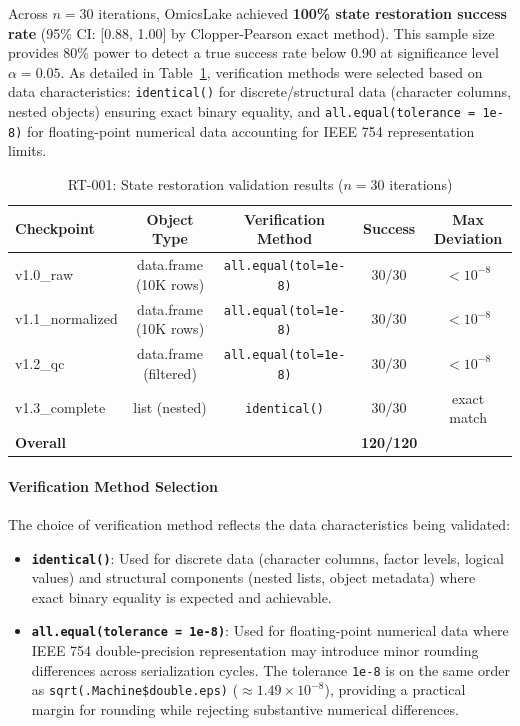 \documentclass[11pt,a4paper]{article}
\begin{document}
Across $n = 30$ iterations, OmicsLake achieved \textbf{100\% state restoration success rate} (95\% CI: [0.88, 1.00] by Clopper-Pearson exact method). This sample size provides 80\% power to detect a true success rate below 0.90 at significance level $\alpha = 0.05$. As detailed in Table~\ref{tab:rt001}, verification methods were selected based on data characteristics: \texttt{identical()} for discrete/structural data (character columns, nested objects) ensuring exact binary equality, and \texttt{all.equal(tolerance = 1e-8)} for floating-point numerical data accounting for IEEE 754 representation limits.

\begin{table}[H]
\centering
\caption{RT-001: State restoration validation results ($n = 30$ iterations)}
\label{tab:rt001}
\begin{tabular}{lcccc}
\toprule
\textbf{Checkpoint} & \textbf{Object Type} & \textbf{Verification Method} & \textbf{Success} & \textbf{Max Deviation} \\
\midrule
v1.0\_raw & data.frame (10K rows) & \texttt{all.equal(tol=1e-8)} & 30/30 & $< 10^{-8}$ \\
v1.1\_normalized & data.frame (10K rows) & \texttt{all.equal(tol=1e-8)} & 30/30 & $< 10^{-8}$ \\
v1.2\_qc & data.frame (filtered) & \texttt{all.equal(tol=1e-8)} & 30/30 & $< 10^{-8}$ \\
v1.3\_complete & list (nested) & \texttt{identical()} & 30/30 & exact match \\
\midrule
\textbf{Overall} & & & \textbf{120/120} & \\
\bottomrule
\end{tabular}
\end{table}

\paragraph{Verification Method Selection}
The choice of verification method reflects the data characteristics being validated:
\begin{itemize}
    \item \textbf{\texttt{identical()}}: Used for discrete data (character columns, factor levels, logical values) and structural components (nested lists, object metadata) where exact binary equality is expected and achievable.
    \item \textbf{\texttt{all.equal(tolerance = 1e-8)}}: Used for floating-point numerical data where IEEE 754 double-precision representation may introduce minor rounding differences across serialization cycles. The tolerance \texttt{1e-8} is on the same order as \texttt{sqrt(.Machine\$double.eps)} (\(\approx 1.49 \times 10^{-8}\)), providing a practical margin for rounding while rejecting substantive numerical differences.
\end{itemize}
\end{document}
